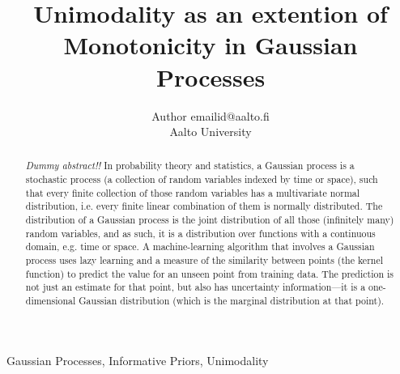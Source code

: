 \documentclass[twoside,11pt]{article}
\begin{document}
\title{Unimodality as an extention of Monotonicity in Gaussian Processes}

\author{\name Author \email emailid@aalto.fi \\
       Aalto University
       }


\maketitle

\begin{abstract}%
\emph{Dummy abstract!!}
In probability theory and statistics, a Gaussian process is a stochastic process (a collection of random variables indexed by time or space), such that every finite collection of those random variables has a multivariate normal distribution, i.e. every finite linear combination of them is normally distributed. The distribution of a Gaussian process is the joint distribution of all those (infinitely many) random variables, and as such, it is a distribution over functions with a continuous domain, e.g. time or space. A machine-learning algorithm that involves a Gaussian process uses lazy learning and a measure of the similarity between points (the kernel function) to predict the value for an unseen point from training data. The prediction is not just an estimate for that point, but also has uncertainty information—it is a one-dimensional Gaussian distribution (which is the marginal distribution at that point)\cite{CaCh06,SoMuLe03}.
\end{abstract}

\begin{keywords}
  Gaussian Processes, Informative Priors, Unimodality 
\end{keywords}













\end{document}
